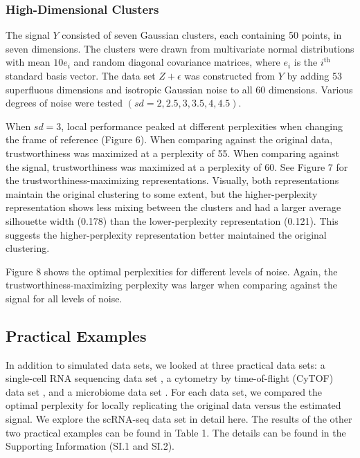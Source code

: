 \documentclass{article}
\begin{document}
\subsubsection{High-Dimensional Clusters}
The signal $Y$ consisted of seven Gaussian clusters, each containing 50 points, in seven dimensions. The clusters were drawn from multivariate normal distributions with mean $10e_i$ and random diagonal covariance matrices, where $e_i$ is the $i^\textrm{th}$ standard basis vector. The data set $Z + \epsilon$ was constructed from $Y$ by adding 53 superfluous dimensions and isotropic Gaussian noise to all 60 dimensions. Various degrees of noise were tested $(sd = 2, 2.5, 3, 3.5, 4, 4.5)$.

When $sd = 3$, local performance peaked at different perplexities when changing the frame of reference (Figure 6). When comparing against the original data, trustworthiness was maximized at a perplexity of 55. When comparing against the signal, trustworthiness was maximized at a perplexity of 60. See Figure 7 for the trustworthiness-maximizing representations. Visually, both representations maintain the original clustering to some extent, but the higher-perplexity representation shows less mixing between the clusters and had a larger average silhouette width (0.178) than the lower-perplexity representation (0.121). This suggests the higher-perplexity representation better maintained the original clustering.

Figure 8 shows the optimal perplexities for different levels of noise. Again, the trustworthiness-maximizing perplexity was larger when comparing against the signal for all levels of noise.

\subsection{Practical Examples}
In addition to simulated data sets, we looked at three practical data sets: a single-cell RNA sequencing data set \cite{scRNA data}, a cytometry by time-of-flight (CyTOF) data set \cite{CyTOF data}, and a microbiome data set \cite{enterotype data}. For each data set, we compared the optimal perplexity for locally replicating the original data versus the estimated signal. We explore the scRNA-seq data set in detail here. The results of the other two practical examples can be found in Table 1. The details can be found in the Supporting Information (SI.1 and SI.2).
\end{document}
